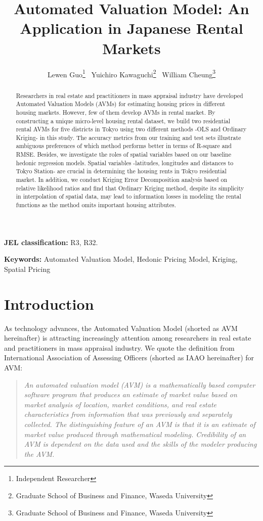 \documentclass[a4paper, 12pt]{article} %
\title{\textbf{Automated Valuation Model: An Application in Japanese Rental Markets}}
\author{Lewen Guo\thanks{Independent Researcher} \  Yuichiro Kawaguchi\thanks{Graduate School of Business and Finance, Waseda University} \  William Cheung\thanks{Graduate School of Business and Finance, Waseda University}}
\begin{document}
\maketitle
\begin{abstract}
Researchers in real estate and practitioners in mass appraisal industry have developed Automated Valuation Models (AVMs) for estimating housing prices in different housing markets. However, few of them develop AVMs in rental market. By constructing a unique micro-level housing rental dataset, we build two residential rental AVMs for five districts in Tokyo using two different methods -OLS and Ordinary Kriging- in this study. The accuracy metrics from our training and test sets illustrate ambiguous preferences of which method performs better in terms of R-square and RMSE. Besides, we investigate the roles of spatial variables based on our baseline hedonic regression models. Spatial variables -latitudes, longitudes and distances to Tokyo Station- are crucial in determining the housing rents in Tokyo residential market. In addition, we conduct Kriging Error Decomposition analysis based on relative likelihood ratios and find that Ordinary Kriging method, despite its simplicity in interpolation of spatial data, may lead to information losses in modeling the rental functions as the method omits important housing attributes.
\end{abstract}
\medskip
\textbf{JEL classification:} R3, R32.

\noindent \textbf{Keywords:} Automated Valuation Model, Hedonic Pricing Model, Kriging, Spatial Pricing
\section{Introduction}

As technology advances, the Automated Valuation Model (shorted as AVM hereinafter) is attracting increasingly attention among researchers in real estate and practitioners in mass appraisal industry. We quote the definition from International Association of Assessing Officers (shorted as IAAO hereinafter) for AVM:

\blockquote{\textit{An automated valuation model (AVM) is a mathematically based computer software program that produces an estimate of market value based on market analysis of location, market conditions, and real estate characteristics from information that was previously and separately collected. The distinguishing feature of an AVM is that it is an estimate of market value produced through mathematical modeling. Credibility of an AVM is dependent on the data used and the skills of the modeler producing the AVM.}}
\end{document}

